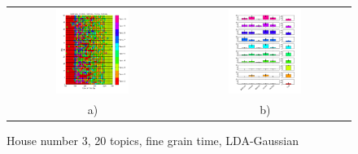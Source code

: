 \begin{figure}[h!]
 \centering
 \begin{tabular}{c c}
  \includegraphics[width=0.45\textwidth]{Pictures/Gaus/fine/DayHN3TS48k20fine.png}
  &
  \includegraphics[width=0.45\textwidth]{Pictures/Gaus/fine/TopHN3TS48k20fine.png}\\
  a) & b)
 \end{tabular}
  \caption{House number 3, 20 topics, fine grain time, LDA-Gaussian}
\end{figure}

